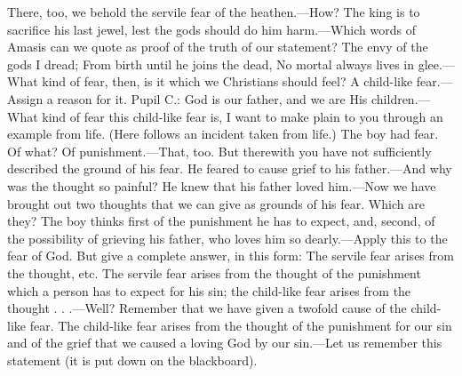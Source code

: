 There, too, we behold the servile fear of the heathen.—How? The king is to sacrifice his last jewel, lest the gods should do him harm.—Which words of Amasis can we quote as proof of the truth of our statement? The envy of the gods I dread; From birth until he joins the dead, No mortal always lives in glee.—What kind of fear, then, is it which we Christians should feel? A child-like fear.—Assign a reason for it. Pupil C.: God is our father, and we are His children.—What kind of fear this child-like fear is, I want to make plain to you through an example from life. (Here follows an incident taken from life.) The boy had fear. Of what? Of punishment.—That, too. But therewith you have not sufficiently described the ground of his fear. He feared to cause grief to his father.—And why was the thought so painful? He knew that his father loved him.—Now we have brought out two thoughts that we can give as grounds of his fear. Which are they? The boy thinks first of the punishment he has to expect, and, second, of the possibility of grieving his father, who loves him so dearly.—Apply this to the fear of God. But give a complete answer, in this form: The servile fear arises from the thought, etc. The servile fear arises from the thought of the punishment which a person has to expect for his sin; the child-like fear arises from the thought . . .—Well? Remember that we have given a twofold cause of the child-like fear. The child-like fear arises from the thought of the punishment for our sin and of the grief that we caused a loving God by our sin.—Let us remember this statement (it is put down on the blackboard).

